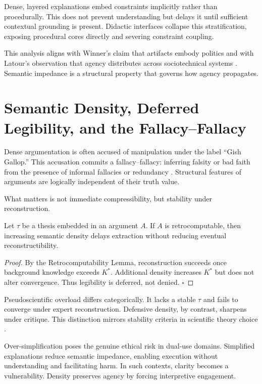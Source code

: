 Dense, layered explanations embed constraints implicitly rather than procedurally. This does not prevent understanding but delays it until sufficient contextual grounding is present. Didactic interfaces collapse this stratification, exposing procedural cores directly and severing constraint coupling.

This analysis aligns with Winner’s claim that artifacts embody politics \cite{winner1980} and with Latour’s observation that agency distributes across sociotechnical systems \cite{latour2005}. Semantic impedance is a structural property that governs how agency propagates.

\section{Semantic Density, Deferred Legibility, and the Fallacy--Fallacy}

Dense argumentation is often accused of manipulation under the label ``Gish Gallop.'' This accusation commits a fallacy--fallacy: inferring falsity or bad faith from the presence of informal fallacies or redundancy \cite{hamblin1970}. Structural features of arguments are logically independent of their truth value.

What matters is not immediate compressibility, but stability under reconstruction.

\begin{lemma}
Let $\tau$ be a thesis embedded in an argument $A$. If $A$ is retrocomputable, then increasing semantic density delays extraction without reducing eventual reconstructibility.
\end{lemma}

\begin{proof}
By the Retrocomputability Lemma, reconstruction succeeds once background knowledge exceeds $K^*$. Additional density increases $K^*$ but does not alter convergence. Thus legibility is deferred, not denied. \hfill $\square$
\end{proof}

Pseudoscientific overload differs categorically. It lacks a stable $\tau$ and fails to converge under expert reconstruction. Defensive density, by contrast, sharpens under critique. This distinction mirrors stability criteria in scientific theory choice \cite{kuhn1962,lakatos1978}.

Over-simplification poses the genuine ethical risk in dual-use domains. Simplified explanations reduce semantic impedance, enabling execution without understanding and facilitating harm. In such contexts, clarity becomes a vulnerability. Density preserves agency by forcing interpretive engagement.

